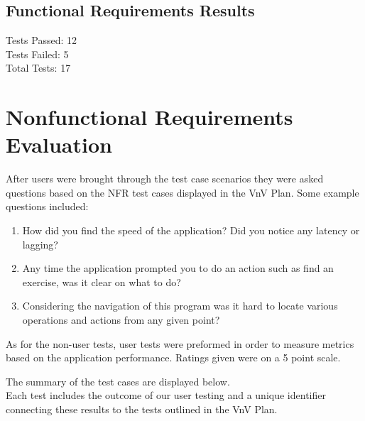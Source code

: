 \documentclass[12pt, titlepage]{article}
\begin{document}
\subsection{Functional Requirements Results}

Tests Passed: 12\\
Tests Failed: 5\\
Total Tests: 17\\

\section{Nonfunctional Requirements Evaluation}

\noindent After users were brought through the test case scenarios they were asked questions based on the NFR test cases displayed in the VnV Plan.
Some example questions included: \\
\begin{enumerate}
	\item How did you find the speed of the application? Did you notice any latency or lagging?
	\item Any time the application prompted you to do an action such as find an exercise, was it clear on what to do?
	\item Considering the navigation of this program was it hard to locate various operations and actions from any given point?
\end{enumerate}

\noindent As for the non-user tests, user tests were preformed in order to measure metrics based on the application performance.
Ratings given were on a 5 point scale.

\noindent The summary of the test cases are displayed below.\\
Each test includes the outcome of our user testing and a unique identifier connecting these results to the tests outlined in the VnV Plan.\\
\end{document}

